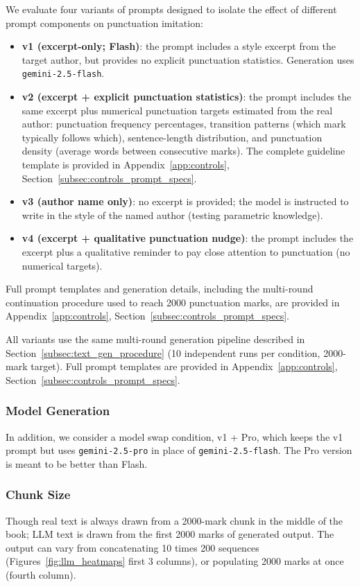 \documentclass{article}
\begin{document}
We evaluate four variants of prompts designed to isolate the effect of different prompt components on punctuation imitation:
\begin{itemize}
    \item \textbf{v1 (excerpt-only; Flash)}: the prompt includes a style excerpt from the target author, but provides no explicit punctuation statistics. Generation uses \texttt{gemini-2.5-flash}.
    \item \textbf{v2 (excerpt + explicit punctuation statistics)}: the prompt includes the same excerpt plus numerical punctuation targets estimated from the real author: punctuation frequency percentages, transition patterns (which mark typically follows which), sentence-length distribution, and punctuation density (average words between consecutive marks). The complete guideline template is provided in Appendix~\ref{app:controls}, Section~\ref{subsec:controls_prompt_specs}.
    \item \textbf{v3 (author name only)}: no excerpt is provided; the model is instructed to write in the style of the named author (testing parametric knowledge).
    \item \textbf{v4 (excerpt + qualitative punctuation nudge)}: the prompt includes the excerpt plus a qualitative reminder to pay close attention to punctuation (no numerical targets).
\end{itemize}
Full prompt templates and generation details, including the multi-round continuation procedure used to reach 2000 punctuation marks, are provided in Appendix~\ref{app:controls}, Section~\ref{subsec:controls_prompt_specs}.

All variants use the same multi-round generation pipeline described in Section~\ref{subsec:text_gen_procedure} (10 independent runs per condition, 2000-mark target). Full prompt templates are provided in Appendix~\ref{app:controls}, Section~\ref{subsec:controls_prompt_specs}.

\subsubsection{Model Generation}
In addition, we consider a model swap condition, v1 + Pro, which keeps the v1 prompt but uses \texttt{gemini-2.5-pro} in place of \texttt{gemini-2.5-flash}. The Pro version is meant to be better than Flash.

\subsubsection{Chunk Size}
Though real text is always drawn from a 2000-mark chunk in the middle of the book; LLM text is drawn from the first 2000 marks of generated output. The output can vary from concatenating 10 times 200 sequences (Figures~\ref{fig:llm_heatmaps} first 3 columns), or populating 2000 marks at once (fourth column).
\end{document}
